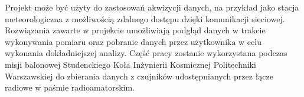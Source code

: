 \newpage
Projekt może być użyty do zastosowań akwizycji danych, na przykład jako stacja meteorologiczna z możliwością zdalnego dostępu dzięki komunikacji sieciowej. Rozwiązania zawarte w projekcie umożliwiają podgląd danych w trakcie wykonywania pomiaru oraz pobranie danych przez użytkownika w celu wykonania dokładniejszej analizy. Część pracy zostanie wykorzystana podczas misji balonowej Studenckiego Koła Inżynierii Kosmicznej Politechniki Warszawskiej do zbierania danych z czujników udostępnianych przez łącze radiowe w paśmie radioamatorskim.
